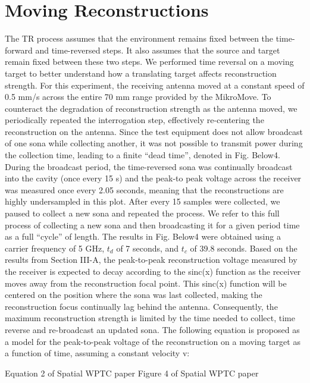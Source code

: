 \chapter{Moving Reconstructions}

\label{ch:moving}

The TR process assumes that the environment remains fixed between the time-forward and time-reversed steps. It also assumes that the source and target remain fixed between these two steps. We performed time reversal on a moving target to better understand how a translating target affects reconstruction strength.
For this experiment, the receiving antenna moved at a constant speed of 0.5 mm/s across the entire 70 mm range provided by the MikroMove. To counteract the degradation of reconstruction strength as the antenna moved, we periodically repeated the interrogation step, effectively re-centering the reconstruction on the antenna. Since the test equipment does not allow broadcast of one sona while collecting another, it was not possible to transmit power during the collection time, leading to a finite “dead time”, denoted in Fig. {Below}4. During the broadcast period, the time-reversed sona was continually broadcast into the cavity (once every 15 s) and the peak-to peak voltage across the receiver was measured once every 2.05 seconds, meaning that the reconstructions are highly undersampled in this plot. After every 15 samples were collected, we paused to collect a new sona and repeated the process. We refer to this full process of collecting a new sona and then broadcasting it for a given period time as a full “cycle” of length. The results in Fig. {Below}4 were obtained using a carrier frequency of 5 GHz, $t_d$ of 7 seconds, and $t_c$ of 39.8 seconds. Based on the results from Section III-A, the peak-to-peak reconstruction voltage measured by the receiver is expected to decay according to the sinc(x) function as the receiver
moves away from the reconstruction focal point. This sinc(x) function will be centered on the position where the sona was last collected, making the reconstruction focus continually lag behind the antenna. Consequently, the maximum reconstruction strength is limited by the time needed to collect, time reverse and re-broadcast an updated sona. The following equation is proposed as a model for the peak-to-peak voltage of the reconstruction on a moving target as a
function of time, assuming a constant velocity v:

{Equation 2 of Spatial WPTC paper}
{Figure 4 of Spatial WPTC paper}
